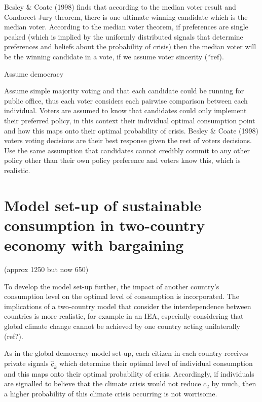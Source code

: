 \documentclass[11pt,preprint, authoryear]{elsarticle}
\numberwithin{equation}{section}
\numberwithin{figure}{section}
\numberwithin{table}{section}
\begin{document}
Besley \& Coate (1998) finds that according to the median voter result
and Condorcet Jury theorem, there is one ultimate winning candidate
which is the median voter. According to the median voter theorem, if
preferences are single peaked (which is implied by the uniformly
distributed signals that determine preferences and beliefs about the
probability of crisis) then the median voter will be the winning
candidate in a vote, if we assume voter sincerity (*ref).

Assume democracy

Assume simple majority voting and that each candidate could be running
for public office, thus each voter considers each pairwise comparison
between each individual. Voters are assumed to know that candidates
could only implement their preferred policy, in this context their
individual optimal consumption point and how this maps onto their
optimal probability of crisis. Besley \& Coate (1998) voters voting
decisions are their best response given the rest of voters decisions.
Use the same assumption that candidates cannot credibly commit to any
other policy other than their own policy preference and voters know
this, which is realistic.

\hypertarget{model-set-up-of-sustainable-consumption-in-two-country-economy-with-bargaining}{%
\section{Model set-up of sustainable consumption in two-country economy
with
bargaining}\label{model-set-up-of-sustainable-consumption-in-two-country-economy-with-bargaining}}

(approx 1250 but now 650)

To develop the model set-up further, the impact of another country's
consumption level on the optimal level of consumption is incorporated.
The implications of a two-country model that consider the
interdependence between countries is more realistic, for example in an
IEA, especially considering that global climate change cannot be
achieved by one country acting unilaterally (ref?).

As in the global democracy model set-up, each citizen in each country
receives private signals \(\hat{\underline{c}}_k\) which determine their
optimal level of individual consumption and this maps onto their optimal
probability of crisis. Accordingly, if individuals are signalled to
believe that the climate crisis would not reduce \(c_2\) by much, then a
higher probability of this climate crisis occurring is not worrisome.
\end{document}
